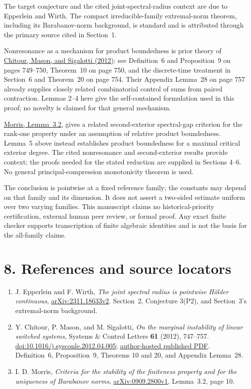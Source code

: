 \documentclass[11pt,a4paper]{article}
\providecommand{\tightlist}{\setlength{\itemsep}{0pt}\setlength{\parskip}{0pt}}
\begin{document}
The target conjecture and the cited joint-spectral-radius context are due to Epperlein and Wirth. The compact irreducible-family extremal-norm theorem, including its Barabanov-norm background, is standard and is attributed through the primary source cited in Section~1.

Nonresonance as a mechanism for product boundedness is prior theory of \href{https://doi.org/10.1016/j.sysconle.2012.04.005}{Chitour, Mason, and Sigalotti (2012)}: see Definition~6 and Proposition~9 on pages 749--750, Theorem~10 on page 750, and the discrete-time treatment in Section~6 and Theorem~20 on page 754. Their Appendix Lemma~28 on page 757 already supplies closely related combinatorial control of sums from paired contraction. Lemmas 2--4 here give the self-contained formulation used in this proof; no novelty is claimed for that general mechanism.

\href{https://arxiv.org/html/0909.2800v1}{Morris, Lemma~3.2}, gives a related second-exterior spectral-gap criterion for the rank-one property under an assumption of relative product boundedness. Lemma~5 above instead establishes product boundedness for a maximal critical exterior degree. The cited nonresonance and second-exterior results provide context; the proofs needed for the stated reduction are supplied in Sections 4--6. No general principal-compression monotonicity theorem is used.

The conclusion is pointwise at a fixed reference family; the constants may depend on that family and its dimension. It does not assert a two-sided estimate uniform over two varying families. This manuscript claims no historical-priority certification, external human peer review, or formal proof. Any exact finite checker supports transcription of finite algebraic identities and is not the basis for the all-family claims.

\section{8. References and source locators}\label{references-and-source-locators}

\begin{enumerate}
\def\labelenumi{\arabic{enumi}.}
\tightlist
\item
  J. Epperlein and F. Wirth, \emph{The joint spectral radius is pointwise Hölder continuous}, \href{https://arxiv.org/html/2311.18633v2}{arXiv:2311.18633v2}. Section~2, Conjecture 3(P2), and Section~3's extremal-norm background.
\item
  Y. Chitour, P. Mason, and M. Sigalotti, \emph{On the marginal instability of linear switched systems}, Systems \& Control Letters \textbf{61} (2012), 747--757. \href{https://doi.org/10.1016/j.sysconle.2012.04.005}{doi:10.1016/j.sysconle.2012.04.005}; \href{https://www.ljll.fr/sigalotti/doc/chitour_mason_sigalotti-SCL.pdf}{author-hosted published PDF}. Definition~6, Proposition~9, Theorems 10 and 20, and Appendix Lemma~28.
\item
  I. D. Morris, \emph{Criteria for the stability of the finiteness property and for the uniqueness of Barabanov norms}, \href{https://arxiv.org/html/0909.2800v1}{arXiv:0909.2800v1}, Lemma~3.2, page 10.
\end{enumerate}
\end{document}
